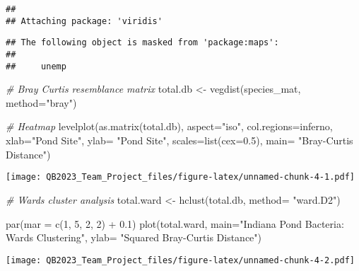 \documentclass[
]{article}
\newenvironment{Shaded}{\begin{snugshade}}{\end{snugshade}}
\newcommand{\AttributeTok}[1]{\textcolor[rgb]{0.77,0.63,0.00}{#1}}
\newcommand{\CommentTok}[1]{\textcolor[rgb]{0.56,0.35,0.01}{\textit{#1}}}
\newcommand{\DecValTok}[1]{\textcolor[rgb]{0.00,0.00,0.81}{#1}}
\newcommand{\FloatTok}[1]{\textcolor[rgb]{0.00,0.00,0.81}{#1}}
\newcommand{\FunctionTok}[1]{\textcolor[rgb]{0.00,0.00,0.00}{#1}}
\newcommand{\NormalTok}[1]{#1}
\newcommand{\OtherTok}[1]{\textcolor[rgb]{0.56,0.35,0.01}{#1}}
\newcommand{\SpecialCharTok}[1]{\textcolor[rgb]{0.00,0.00,0.00}{#1}}
\newcommand{\StringTok}[1]{\textcolor[rgb]{0.31,0.60,0.02}{#1}}
\begin{document}
\begin{verbatim}
## 
## Attaching package: 'viridis'
\end{verbatim}

\begin{verbatim}
## The following object is masked from 'package:maps':
## 
##     unemp
\end{verbatim}

\begin{Shaded}
\begin{Highlighting}[]
\CommentTok{\# Bray Curtis resemblance matrix}
\NormalTok{total.db }\OtherTok{\textless{}{-}} \FunctionTok{vegdist}\NormalTok{(species\_mat, }\AttributeTok{method=}\StringTok{"bray"}\NormalTok{)}

\CommentTok{\# Heatmap }
\FunctionTok{levelplot}\NormalTok{(}\FunctionTok{as.matrix}\NormalTok{(total.db), }\AttributeTok{aspect=}\StringTok{"iso"}\NormalTok{, }\AttributeTok{col.regions=}\NormalTok{inferno,}
          \AttributeTok{xlab=}\StringTok{"Pond Site"}\NormalTok{, }\AttributeTok{ylab=} \StringTok{"Pond Site"}\NormalTok{, }\AttributeTok{scales=}\FunctionTok{list}\NormalTok{(}\AttributeTok{cex=}\FloatTok{0.5}\NormalTok{), }
          \AttributeTok{main=} \StringTok{"Bray{-}Curtis Distance"}\NormalTok{)}
\end{Highlighting}
\end{Shaded}

\texttt{[image: QB2023\_Team\_Project\_files/figure-latex/unnamed-chunk-4-1.pdf]}

\begin{Shaded}
\begin{Highlighting}[]
\CommentTok{\# Wards cluster analysis}
\NormalTok{total.ward }\OtherTok{\textless{}{-}} \FunctionTok{hclust}\NormalTok{(total.db, }\AttributeTok{method=} \StringTok{"ward.D2"}\NormalTok{)}

\FunctionTok{par}\NormalTok{(}\AttributeTok{mar =} \FunctionTok{c}\NormalTok{(}\DecValTok{1}\NormalTok{, }\DecValTok{5}\NormalTok{, }\DecValTok{2}\NormalTok{, }\DecValTok{2}\NormalTok{) }\SpecialCharTok{+} \FloatTok{0.1}\NormalTok{)}
\FunctionTok{plot}\NormalTok{(total.ward, }\AttributeTok{main=}\StringTok{"Indiana Pond Bacteria: Ward\textquotesingle{}s Clustering"}\NormalTok{, }\AttributeTok{ylab=} \StringTok{"Squared Bray{-}Curtis Distance"}\NormalTok{)}
\end{Highlighting}
\end{Shaded}

\texttt{[image: QB2023\_Team\_Project\_files/figure-latex/unnamed-chunk-4-2.pdf]}
\end{document}
